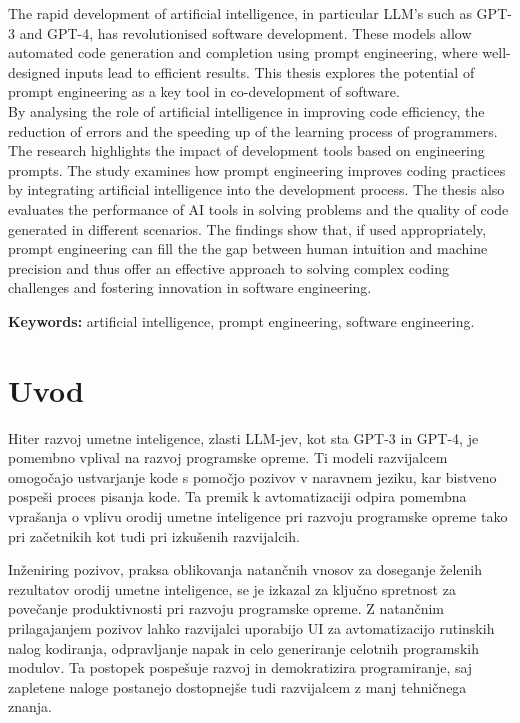 \documentclass[a4paper,12pt,openright]{book}
\newcommand{\tkeywordsEn}{artificial intelligence, prompt engineering, software engineering}
\newcommand{\clearemptydoublepage}{\newpage{\pagestyle{empty}\cleardoublepage}}
\begin{document}
\noindent The rapid development of artificial intelligence, in particular LLM's such as
GPT-3 and GPT-4, has revolutionised software development. These models
allow automated code generation and completion using prompt engineering, where well-designed inputs lead to efficient results. This thesis explores the potential of prompt engineering as a key tool in co-development of software. \\
By analysing the role of artificial intelligence in improving code efficiency,
the reduction of errors and the speeding up of the learning process of programmers.
The research highlights the impact of development tools based on
engineering prompts. The study examines how prompt engineering improves
coding practices by integrating artificial intelligence into the development process.
The thesis also evaluates the performance of AI tools in solving
problems and the quality of code generated in different scenarios.
The findings show that, if used appropriately, prompt engineering can fill the
the gap between human intuition and machine precision and thus offer an effective
approach to solving complex coding challenges and fostering innovation in
software engineering.
\bigskip

\noindent\textbf{Keywords:} \tkeywordsEn.
\clearemptydoublepage


\chapter{Uvod}

Hiter razvoj umetne inteligence, zlasti LLM-jev, kot sta GPT-3 in GPT-4, je pomembno vplival na razvoj programske opreme. Ti modeli razvijalcem omogočajo ustvarjanje kode s pomočjo pozivov v naravnem jeziku, kar bistveno pospeši proces pisanja kode. Ta premik k avtomatizaciji odpira pomembna vprašanja o vplivu orodij umetne inteligence pri razvoju programske opreme tako pri začetnikih kot tudi pri izkušenih razvijalcih.


Inženiring pozivov, praksa oblikovanja natančnih vnosov za doseganje želenih rezultatov orodij umetne inteligence, se je izkazal za ključno spretnost za povečanje produktivnosti pri razvoju programske opreme. Z natančnim prilagajanjem pozivov lahko razvijalci uporabijo UI za avtomatizacijo rutinskih nalog kodiranja, odpravljanje napak in celo generiranje celotnih programskih modulov. Ta postopek pospešuje razvoj in demokratizira programiranje, saj zapletene naloge postanejo dostopnejše tudi razvijalcem z manj tehničnega znanja.
\end{document}
